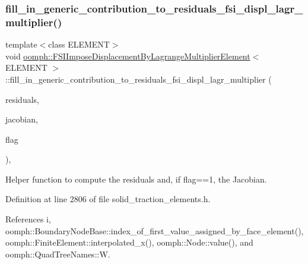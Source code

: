 \subsubsection{\texorpdfstring{fill\+\_\+in\+\_\+generic\+\_\+contribution\+\_\+to\+\_\+residuals\+\_\+fsi\+\_\+displ\+\_\+lagr\+\_\+multiplier()}{fill\_in\_generic\_contribution\_to\_residuals\_fsi\_displ\_lagr\_multiplier()}}
{\footnotesize\ttfamily template$<$class E\+L\+E\+M\+E\+NT$>$ \\
void \hyperlink{classoomph_1_1FSIImposeDisplacementByLagrangeMultiplierElement}{oomph\+::\+F\+S\+I\+Impose\+Displacement\+By\+Lagrange\+Multiplier\+Element}$<$ E\+L\+E\+M\+E\+NT $>$\+::fill\+\_\+in\+\_\+generic\+\_\+contribution\+\_\+to\+\_\+residuals\+\_\+fsi\+\_\+displ\+\_\+lagr\+\_\+multiplier (\begin{DoxyParamCaption}\item[{\hyperlink{classoomph_1_1Vector}{Vector}$<$ double $>$ \&}]{residuals,  }\item[{\hyperlink{classoomph_1_1DenseMatrix}{Dense\+Matrix}$<$ double $>$ \&}]{jacobian,  }\item[{const unsigned \&}]{flag }\end{DoxyParamCaption})\hspace{0.3cm}{\ttfamily [inline]}, {\ttfamily [protected]}}



Helper function to compute the residuals and, if flag==1, the Jacobian. 



Definition at line 2806 of file solid\+\_\+traction\+\_\+elements.\+h.



References i, oomph\+::\+Boundary\+Node\+Base\+::index\+\_\+of\+\_\+first\+\_\+value\+\_\+assigned\+\_\+by\+\_\+face\+\_\+element(), oomph\+::\+Finite\+Element\+::interpolated\+\_\+x(), oomph\+::\+Node\+::value(), and oomph\+::\+Quad\+Tree\+Names\+::W.

\mbox{\label{classoomph_1_1FSIImposeDisplacementByLagrangeMultiplierElement_a7134be65db436042a327e7e9d49fb507}} 
